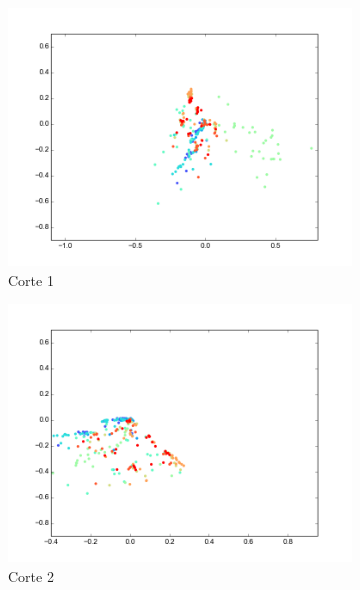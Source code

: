 \begin{figure}[H]
        \begin{subfigure}[b]{0.33\textwidth}
                \includegraphics[width=\linewidth]{secciones/graficos/sanger/eje1_valid.png}
                \caption{Corte 1}
                \label{fig: ej1_sanger_eje_1_valid}
        \end{subfigure}
        \begin{subfigure}[b]{0.33\textwidth}
                \includegraphics[width=\linewidth]{secciones/graficos/sanger/eje2_valid.png}
                \caption{Corte 2}
                \label{fig: ej1_sanger_eje_2_valid}
        \end{subfigure}
        \begin{subfigure}[b]{0.33\textwidth}

\end{subfigure}
\end{figure}

